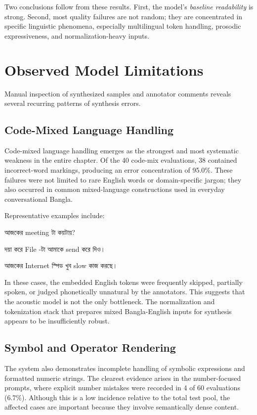 Two conclusions follow from these results. First, the model's \textit{baseline readability} is strong. Second, most quality failures are not random; they are concentrated in specific linguistic phenomena, especially multilingual token handling, prosodic expressiveness, and normalization-heavy inputs.

\section{Observed Model Limitations}

Manual inspection of synthesized samples and annotator comments reveals several recurring patterns of synthesis errors.

\subsection{Code-Mixed Language Handling}

Code-mixed language handling emerges as the strongest and most systematic weakness in the entire chapter. Of the 40 code-mix evaluations, 38 contained incorrect-word markings, producing an error concentration of 95.0\%. These failures were not limited to rare English words or domain-specific jargon; they also occurred in common mixed-language constructions used in everyday conversational Bangla.

Representative examples include:

\bengalifont আজকের \normalfont meeting \bengalifont টা কয়টায়? \normalfont

\bengalifont দয়া করে \normalfont File \bengalifont-টা আমাকে \normalfont send \bengalifont করে দিও। \normalfont

\bengalifont আজকের \normalfont Internet \bengalifont স্পিড খুব \normalfont slow \bengalifont কাজ করছে। \normalfont

In these cases, the embedded English tokens were frequently skipped, partially spoken, or judged phonetically unnatural by the annotators. This suggests that the acoustic model is not the only bottleneck. The normalization and tokenization stack that prepares mixed Bangla-English inputs for synthesis appears to be insufficiently robust.

\subsection{Symbol and Operator Rendering}

The system also demonstrates incomplete handling of symbolic expressions and formatted numeric strings. The clearest evidence arises in the number-focused prompts, where explicit number mistakes were recorded in 4 of 60 evaluations (6.7\%). Although this is a low incidence relative to the total test pool, the affected cases are important because they involve semantically dense content.

